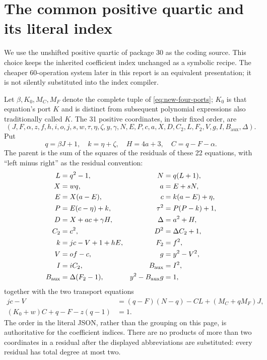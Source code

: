 \section{The common positive quartic and its literal index}
\label{sec:parent}

We use the unshifted positive quartic of package 30 as the coding source.
This choice keeps the inherited coefficient index unchanged as a
symbolic recipe.  The cheaper 60-operation system later in this report
is an equivalent presentation; it is not silently substituted into the
index compiler.

Let $\beta,K_0,M_C,M_F$ denote the complete tuple of
\eqref{eq:new-four-ports}; $K_0$ is that equation's port $K$ and is distinct
from subsequent polynomial expressions also traditionally called $K$.
The 31 positive coordinates, in their fixed order, are
\[
 (J,F,\alpha,z,f,h,i,o,j,s,w,\tau,\eta,\zeta,y,\gamma,
 N,E,P,c,a,X,D,C_2,L,F_2,V,g,I,B_{\mathrm{aux}},\Delta).
\]
Put
\[
 q=\beta J+1,\quad k=\eta+\zeta,\quad
 H=4a+3,\quad C=q-F-\alpha.
\]
The parent is the sum of the squares of the residuals of these 22
equations, with ``left minus right'' as the residual convention:
\begin{alignat}{2}
 L&=q^2-1, &\qquad N&=q(L+1),\notag\\
 X&=wq, & a&=E+sN,\notag\\
 E&=X(a-E), & c&=k(a-E)+\eta,\notag\\
 P&=E(c-\eta)+k, & \tau^2&=P(P-k)+1,\notag\\
 D&=X+ac+\gamma H, & \Delta&=a^2+H,\notag\\
 C_2&=c^2, & D^2&=\Delta C_2+1,\notag\\
 k&=jc-V+1+hE, & F_2&=f^2,\notag\\
 V&=of-c, & g&=y^2-V^2,\notag\\
 I&=iC_2, & B_{\mathrm{aux}}&=I^2,\notag\\
 B_{\mathrm{aux}}&=\Delta(F_2-1), & y^2-B_{\mathrm{aux}}g&=1,
 \label{eq:parent-quadratic}
\end{alignat}
together with the two transport equations
\begin{align}
 jc-V&=(q-F)(N-q)-CL+(M_C+qM_F)J,\label{eq:parent-mask}\\
 (K_0+w)C+q-F-z(q-1)&=1.\label{eq:parent-transport}
\end{align}
The order in the literal JSON, rather than the grouping on this page,
is authoritative for the coefficient indices.  There are no products of
more than two coordinates in a residual after the displayed abbreviations
are substituted: every residual has total degree at most two.

